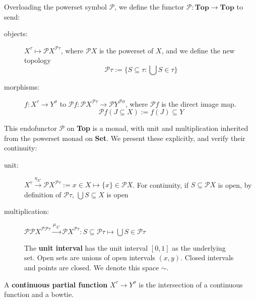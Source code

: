 

\begin{defn}
Overloading the powerset symbol $\mathcal{P}$, we define the functor $\mathcal{P}: \mathbf{Top} \rightarrow \mathbf{Top}$ to send:
\begin{description}
\item[objects:] $X^\tau \mapsto \mathcal{P}X^{\mathcal{P}\tau}$, where $\mathcal{P}X$ is the powerset of $X$, and we define the new topology \[\mathcal{P}\tau := \{ S \subseteq \tau : \bigcup S \in \tau \}\]
\item[morphisms:] $f: X^\tau \rightarrow Y^\sigma$ to $\mathcal{P}f: \mathcal{P}X^{\mathcal{P}\tau} \rightarrow \mathcal{P}Y^{\mathcal{P}\sigma}$, where $\mathcal{P}f$ is the direct image map.
\[\mathcal{P}f(J \subseteq X) := f(J) \subseteq Y\]
\end{description}
This endofunctor $\mathcal{P}$ on \textbf{Top} is a monad, with unit and multiplication inherited from the powerset monad on \textbf{Set}. We present these explicitly, and verify their continuity:
\begin{description}
\item[unit:] $X^\tau \overset{\eta_{X^{\tau}}}{\longrightarrow} \mathcal{P}X^{\mathcal{P}\tau} := x \in X \mapsto \{x\} \in \mathcal{P}X$.
For continuity, if $S \subseteq \mathcal{P}X$ is open, by definition of $\mathcal{P}\tau$, $\bigcup S \subseteq X$ is open
\item[multiplication:] $\mathcal{P}\mathcal{P}X^{\mathcal{P}\mathcal{P}\tau} \overset{\mu_{X^{\tau}}}{\longrightarrow} \mathcal{P}X^{\mathcal{P}\tau}: S \subseteq \mathcal{P}\tau \mapsto \bigcup S \in \mathcal{P}\tau$
\end{description}
\end{defn}




\begin{figure}\label{space:line}
\caption{The \textbf{unit interval} has the unit interval $[0,1]$ as the underlying set. Open sets are unions of open intervals $(x,y)$. Closed intervals and points are closed. We denote this space $\sim$.}
\end{figure}

\begin{defn}
A \textbf{continuous partial function} $X^\tau \rightarrow Y^\sigma$ is the intersection of a continuous function and a bowtie. 
\end{defn}


